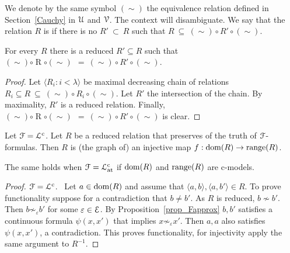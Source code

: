 \documentclass{amsproc}
\renewcommand*{\emph}[1]{%
   \smash{\tikz[baseline]\node[rectangle, fill=teal!25, rounded corners, inner xsep=0.5ex, inner ysep=0.2ex, anchor=base, minimum height = 2.7ex]{\strut #1};}}
\begin{document}
{We denote by the same symbol $(\sim)$ the equivalence relation defined in Section~\ref{Cauchy} in ${\EuScript U}$ and ${\EuScript V}$.
The context will disambiguate.
We say that the relation $R$ is \emph{reduced\/} if there is no $R'\ \subset\ R$ such that $R\ \subseteq\ \mathrel{(\sim)}\circ \mathrel{R'}\circ\mathrel{(\sim)}$.

\begin{fact}
  For every $R$ there is a reduced $R'\subseteq R$ such that $\mathrel{(\sim)}\circ \mathrel{R}\circ\mathrel{(\sim)}\ \ =\ \mathrel{(\sim)}\circ \mathrel{R'}\circ\mathrel{(\sim)}$.
\end{fact}

\begin{proof}
  Let $\langle R_i:i<\lambda\rangle$ be maximal decreasing chain of relations $R_i\mathrel{\subseteq}R\ \subseteq\ \mathrel{(\sim)}\circ \mathrel{R_i}\circ\mathrel{(\sim)}$.
  Let  $R'$ the intersection  of the chain.
  By maximality, $R'$ is a reduced relation.
  Finally, $\mathrel{(\sim)}\circ \mathrel{R}\circ\mathrel{(\sim)}\ \ =\ \mathrel{(\sim)}\circ \mathrel{R'}\circ\mathrel{(\sim)}$ is clear.
\end{proof}




\begin{fact}\label{fact_reduced_funct} 
  Let ${\EuScript F}={\EuScript L}^{\rm c}$.
  Let $R$ be a reduced relation that preserves of the truth of ${\EuScript F}$-formulas.
  Then $R$ is (the graph of) an injective map $f:{\rm dom}(R)\to{\rm range}(R)$.

  The same holds when ${\EuScript F}={\EuScript L}^{\rm c}_{\rm at}$ if ${\rm dom}(R)$ and ${\rm range}(R)$ are c-models.
\end{fact}

\begin{proof}
  ${\EuScript F}={\EuScript L}^{\rm c}$. \ 
  Let $a\in{\rm dom}(R)$ and assume that $\langle a,b\rangle,\langle a,b'\rangle\in R$.
  To prove functionality suppose for a contradiction that $b\neq b'$.
  As $R$ is reduced, $b\not\sim b'$.
  Then $b\not\sim_\varepsilon b'$ for some $\varepsilon\in{\EuScript E}$.
  By Proposition~\ref{prop_Fapprox} $b,b'$ satisfies a continuous formula $\psi(x,x')$ that implies  $x\not\sim_\varepsilon x'$.
  Then $a,a$ also satisfies $\psi(x,x')$, a contradiction.
  This proves functionality, for injectivity apply the same argument to $R^{-1}$.


\end{proof}}
\end{document}
